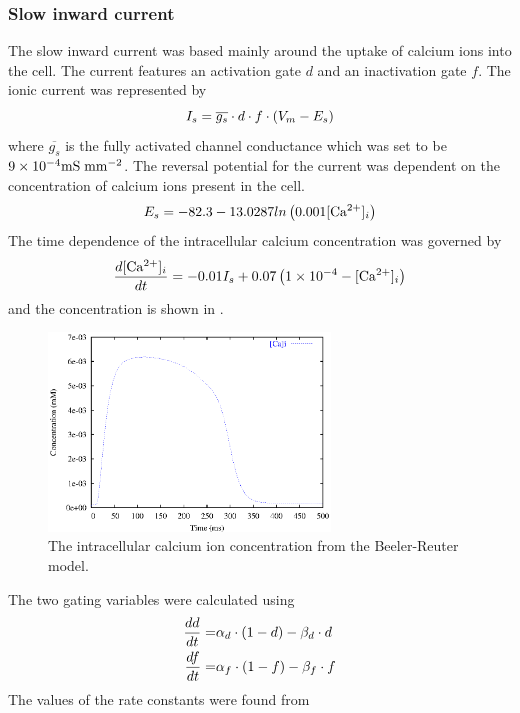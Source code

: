 \subsubsection{Slow inward current}
The slow inward current was based mainly around the uptake of calcium ions
into the cell. The current features an activation gate $d$ and an inactivation
gate $f$. The ionic current was represented by
\begin{equation}
  I_s=\overline{g_s}\cdot d\cdot f\cdot \left( V_m-E_s \right)
\end{equation}
where $\overline{g_s}$ is the fully activated channel conductance which was
set to be $9\times 10^{-4}\mathrm{mS}\thickspace\mathrm{mm}^{-2}$. The reversal potential
for the current was dependent on the concentration of calcium ions present in
the cell.
\begin{equation}
  E_s=-82.3-13.0287 ln\left( 0.001 [\mathrm{Ca^{2+}}]_{i}  \right) 
\end{equation}
The time dependence of the intracellular calcium concentration was governed by
\begin{equation}
   \dfrac{ d  [\mathrm{Ca^{2+}}]_{i} }{d t} =-0.01 I_s + 0.07\left( 1\times 10^{-4} -  [\mathrm{Ca^{2+}}]_{i}  \right)
\end{equation}
and the concentration is shown in .
\begin{figure}[hbtp] 
  \centering
  \includegraphics[width=75mm]{cardiac_electrophysiology/epsfiles/BR_Cai.eps}
  \caption[Beeler-Reuter intracellular calcium concentration]{The
    intracellular calcium ion concentration from the Beeler-Reuter model.}
  \label{fig:BR_cai}
\end{figure}
The two gating variables were calculated using
\begin{align}
  \label{eqn:br_dt}
   \dfrac{ d d}{d t} =&\alpha_{d}\cdot\left( 1-d \right)-\beta_{d}\cdot d \\
  \label{eqn:br_ft}
   \dfrac{ d f}{d t} =&\alpha_{f}\cdot\left( 1-f \right)-\beta_{f}\cdot f
\end{align}
The values of the rate constants were found from
